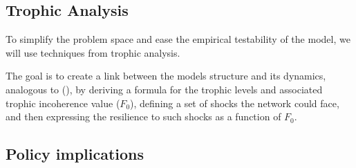 \documentclass[american]{scrartcl}
\begin{document}

\subsection{Trophic Analysis}

To simplify the problem space and ease the empirical testability of the model, we will use techniques from trophic analysis.

The goal is to create a link between the models structure and its dynamics, analogous to \citeauthor{MacKay2020} (\citeyear[p.~19]{MacKay2020}), by deriving a formula for the trophic levels and associated trophic incoherence value ($F_0$), defining a set of shocks the network could face, and then expressing the resilience to such shocks as a function of $F_0$.



\subsection{Policy implications}

\newpage

\printbibliography
\end{document}
